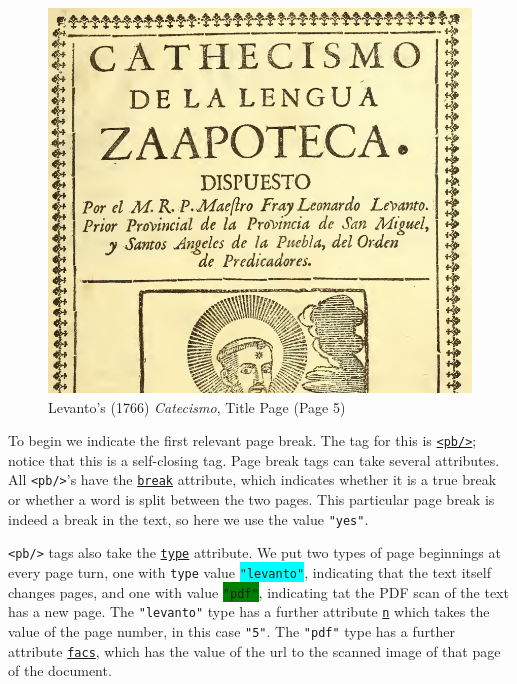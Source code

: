 \documentclass[12pt,a4paper]{article}
\begin{document}
\begin{figure}[h]
\centerline{\includegraphics[scale=0.35]{Levanto1766_TitlePage} }
\caption{Levanto's (1766) \emph{Catecismo}, Title Page (Page 5)}
\label{fig:levanto1766_TitlePage}
\end{figure}

To begin we indicate the first relevant page break.  The tag for this is \hyperref[tag-sec:pb]{\texttt{<pb/>}}; notice that this is a self-closing tag.  Page break tags can take several attributes.  All \texttt{<pb/>}'s have the \hyperref[att-sec:break]{\texttt{break}} attribute, which indicates whether it is a true break or whether a word is split between the two pages.  This particular page break is indeed a break in the text, so here we use the value \texttt{"yes"}.

\texttt{<pb/>} tags also take the \hyperref[att-sec:type]{\texttt{type}} attribute.  We put two types of page beginnings at every page turn, one with \texttt{type} value \colorbox{cyan}{\texttt{"levanto"}}, indicating that the text itself changes pages, and one with value \colorbox{green}{\texttt{"pdf"}}, indicating tat the PDF scan of the text has a new page.  The \texttt{"levanto"} type has a further attribute \hyperref[att-sec:n]{\texttt{n}} which takes the value of the page number, in this case \texttt{"5"}.  The \texttt{"pdf"} type has a further attribute \hyperref[att-sec:facs]{\texttt{facs}}, which has the value of the url to the scanned image of that page of the document.
\end{document}
